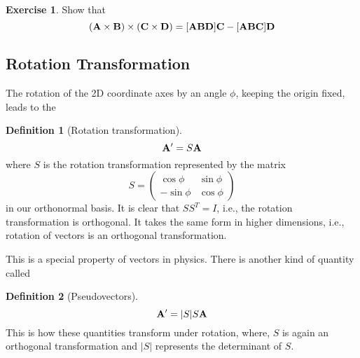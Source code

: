 \documentclass[10pt, a4paper]{extarticle}
\theoremstyle{definition}
\newtheorem{defn}{Definition}
\newtheorem{ex}{Exercise}
\begin{document}
\begin{ex}
	Show that
	\[(\vb{A}\times\vb{B})\times(\vb{C}\times\vb{D})=[\vb{ABD}]\vb{C}-[\vb{ABC}]\vb{D}\]
\end{ex}

\subsection{Rotation Transformation}
The rotation of the 2D coordinate axes by an angle $\phi$, keeping the origin fixed, leads to the
\begin{framed}
	\begin{defn}[Rotation transformation]
		\[\vb{A'}=S\vb{A}\]
		where $S$ is the rotation transformation represented by the matrix
		\[S=\left(\begin{matrix}
					\cos\phi  & \sin\phi \\
					-\sin\phi & \cos\phi
				\end{matrix}\right)\] in our orthonormal basis.
		It is clear that $SS^T=I$, i.e., the rotation transformation is orthogonal. It takes the same form in higher dimensions, i.e., rotation of vectors is an orthogonal transformation.
	\end{defn}
\end{framed}
This is a special property of vectors in physics. There is another kind of quantity called
\begin{framed}
	\begin{defn}[Pseudovectors]
		\[\vb{A'}=|S|S\vb{A}\]
		This is how these quantities transform under rotation, where, $S$ is again an orthogonal transformation and $|S|$ represents the determinant of $S$.
	\end{defn}
\end{framed}
\end{document}
